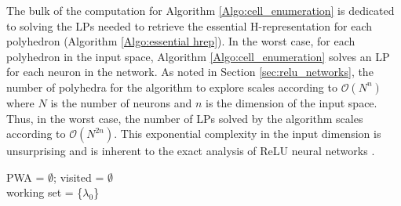 The bulk of the computation for Algorithm \ref{Algo:cell_enumeration} is dedicated to solving the LPs needed to retrieve the essential H-representation for each polyhedron (Algorithm \ref{Algo:essential hrep}).
In the worst case, for each polyhedron in the input space, Algorithm \ref{Algo:cell_enumeration} solves an LP for each neuron in the network. 
As noted in Section \ref{sec:relu_networks}, the number of polyhedra for the algorithm to explore scales according to $\mathcal{O}(N^n)$ where $N$ is the number of neurons and $n$ is the dimension of the input space.
Thus, in the worst case, the number of LPs solved by the algorithm scales according to $\mathcal{O}(N^{2n})$.
This exponential complexity in the input dimension is unsurprising and is inherent to the exact analysis of ReLU neural networks \cite{reluplex}.


\begin{algorithm}
\SetAlgoLined
\DontPrintSemicolon
 PWA = $\emptyset$;  visited = $\emptyset$ \\
 working set = \{$\lambda_0$\} \\
 \caption{Reachable Polyhedral Marching}
 \label{Algo:cell_enumeration}
\end{algorithm}